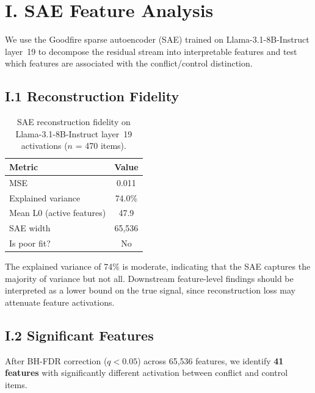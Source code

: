 \documentclass{article}
\begin{document}

\section*{I. SAE Feature Analysis}
\label{sec:appendix_sae}

We use the Goodfire sparse autoencoder (SAE) trained on
Llama-3.1-8B-Instruct layer~19 to decompose the residual stream
into interpretable features and test which features are associated
with the conflict/control distinction.

\subsection*{I.1 Reconstruction Fidelity}

\begin{table}[ht]
\centering
\caption{SAE reconstruction fidelity on Llama-3.1-8B-Instruct
  layer~19 activations ($n$ = 470 items).}
\label{tab:sae_fidelity}
\vspace{4pt}
\small
\begin{tabular}{lc}
\toprule
\textbf{Metric} & \textbf{Value} \\
\midrule
MSE                  & 0.011 \\
Explained variance   & 74.0\% \\
Mean L0 (active features) & 47.9 \\
SAE width            & 65{,}536 \\
Is poor fit?         & No \\
\bottomrule
\end{tabular}
\end{table}

\noindent The explained variance of 74\% is moderate, indicating that
the SAE captures the majority of variance but not all.  Downstream
feature-level findings should be interpreted as a lower bound on
the true signal, since reconstruction loss may attenuate feature
activations.

\subsection*{I.2 Significant Features}

After BH-FDR correction ($q < 0.05$) across 65{,}536 features, we
identify \textbf{41 features} with significantly different activation
between conflict and control items.
\end{document}
